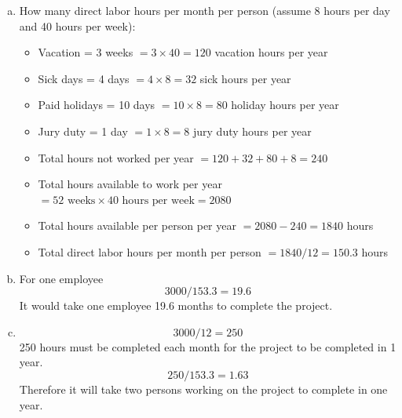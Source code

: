 \documentclass[letterpaper,10pt]{article}
\begin{document}
\begin{enumerate}[a.]
\item How many direct labor hours per month per person (assume 8 hours per day and 40 hours per week):
\begin{itemize}
\item Vacation = 3 weeks $=3\times 40=120$ vacation hours per year \\
\item Sick days = 4 days  $=4\times 8=32$ sick hours per year \\
\item Paid holidays = 10 days $=10\times 8=80$  holiday hours per year \\
\item Jury duty = 1 day $=1\times 8=8$ jury duty hours per year \\
\item Total hours not worked per year $=120+32+80+8=240$ \\
\item Total hours available to work per year$=52 \mbox{\ weeks}\times 40 \mbox{\ hours per week}=2080$ \\
\item Total hours available per person per year $=2080-240=1840$ hours \\
\item Total direct labor hours per month per person $=1840/12=150.3$ hours
\end{itemize}
\item For one employee \[ 3000/153.3 =19.6 \] It would take one employee 19.6 months to complete the project.
\item \[ 3000/12 = 250 \] 250 hours must be completed each month for the project to be completed in 1 year. \[ 250/153.3 = 1.63 \] Therefore it will take two persons working on the project to complete in one year.
\end{enumerate}
\end{document}
